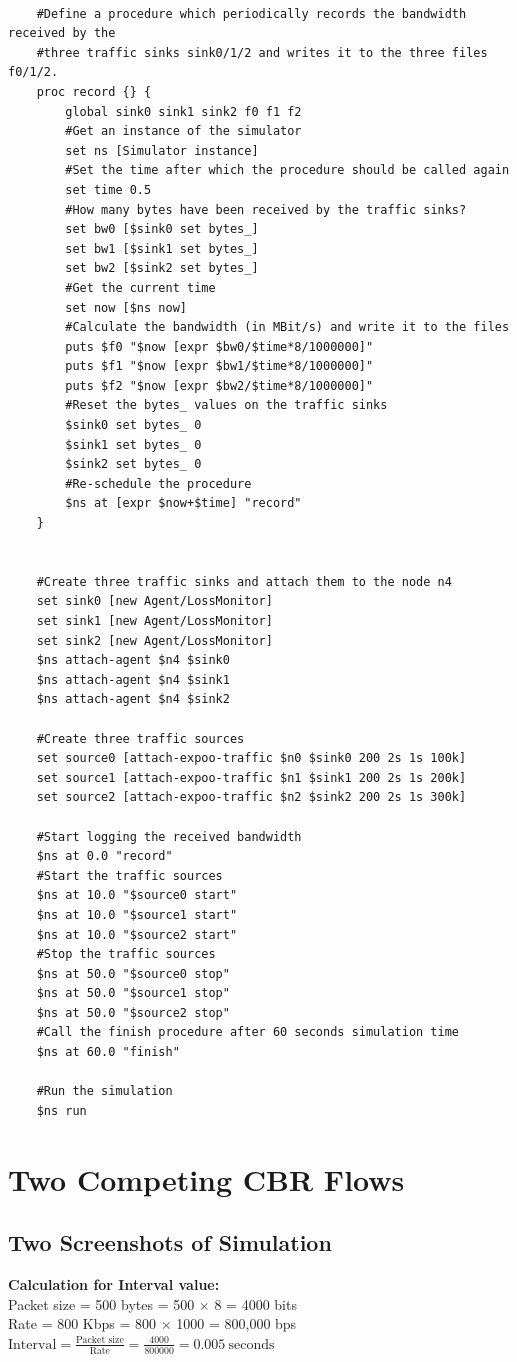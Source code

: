 \documentclass[12pt]{article}
\begin{document}
\begin{lstlisting}
	
	#Define a procedure which periodically records the bandwidth received by the
	#three traffic sinks sink0/1/2 and writes it to the three files f0/1/2.
	proc record {} {
		global sink0 sink1 sink2 f0 f1 f2
		#Get an instance of the simulator
		set ns [Simulator instance]
		#Set the time after which the procedure should be called again
		set time 0.5
		#How many bytes have been received by the traffic sinks?
		set bw0 [$sink0 set bytes_]
		set bw1 [$sink1 set bytes_]
		set bw2 [$sink2 set bytes_]
		#Get the current time
		set now [$ns now]
		#Calculate the bandwidth (in MBit/s) and write it to the files
		puts $f0 "$now [expr $bw0/$time*8/1000000]"
		puts $f1 "$now [expr $bw1/$time*8/1000000]"
		puts $f2 "$now [expr $bw2/$time*8/1000000]"
		#Reset the bytes_ values on the traffic sinks
		$sink0 set bytes_ 0
		$sink1 set bytes_ 0
		$sink2 set bytes_ 0
		#Re-schedule the procedure
		$ns at [expr $now+$time] "record"
	}
	
	
	#Create three traffic sinks and attach them to the node n4
	set sink0 [new Agent/LossMonitor]
	set sink1 [new Agent/LossMonitor]
	set sink2 [new Agent/LossMonitor]
	$ns attach-agent $n4 $sink0
	$ns attach-agent $n4 $sink1
	$ns attach-agent $n4 $sink2
	
	#Create three traffic sources
	set source0 [attach-expoo-traffic $n0 $sink0 200 2s 1s 100k]
	set source1 [attach-expoo-traffic $n1 $sink1 200 2s 1s 200k]
	set source2 [attach-expoo-traffic $n2 $sink2 200 2s 1s 300k]
	
	#Start logging the received bandwidth
	$ns at 0.0 "record"
	#Start the traffic sources
	$ns at 10.0 "$source0 start"
	$ns at 10.0 "$source1 start"
	$ns at 10.0 "$source2 start"
	#Stop the traffic sources
	$ns at 50.0 "$source0 stop"
	$ns at 50.0 "$source1 stop"
	$ns at 50.0 "$source2 stop"
	#Call the finish procedure after 60 seconds simulation time
	$ns at 60.0 "finish"
	
	#Run the simulation
	$ns run
	\end{lstlisting}
	
	\section{Two Competing CBR Flows}
	
	\subsection{Two Screenshots of Simulation}
	
	\textbf{Calculation for Interval value:}	\\
	Packet size = 500 bytes = 500 $\times$ 8 = 4000 bits \\
	Rate = 800 Kbps = 800 $\times$ 1000 = 800,000 bps \\
	$\text{Interval} = \frac{\text{Packet size}}{\text{Rate}} = \frac{4000}{800000} = 0.005~\text{seconds}$
	
\end{document}
